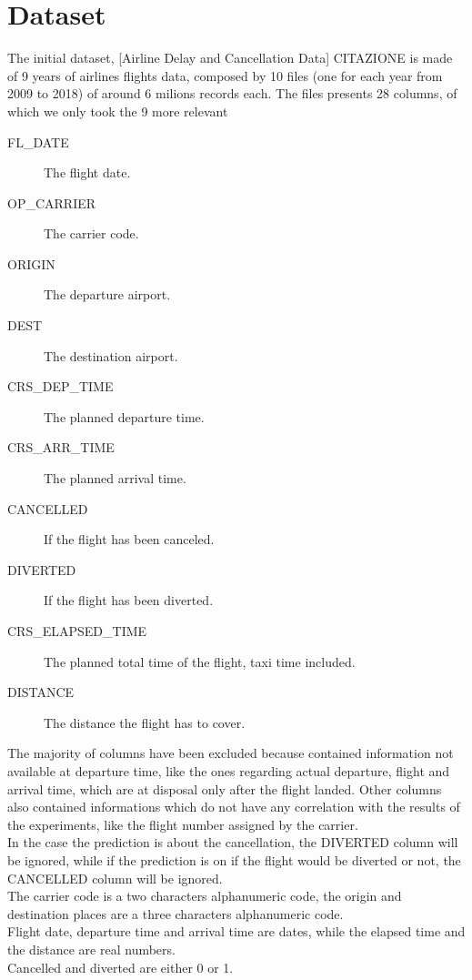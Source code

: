\documentclass[
	letterpaper, %
	10pt, %
]{class}
\begin{document}

\section{Dataset}

The initial dataset, [Airline Delay and Cancellation Data] CITAZIONE is made of 9 years of airlines flights data, composed by 10 files (one for each year from 2009 to 2018) of around 6 milions records each.
The files presents 28 columns, of which we only took the 9 more relevant\\

\begin{description}
	\item[FL\_DATE] The flight date.
	\item[OP\_CARRIER] The carrier code.
	\item[ORIGIN] The departure airport.
	\item[DEST] The destination airport.
	\item[CRS\_DEP\_TIME] The planned departure time.
	\item[CRS\_ARR\_TIME] The planned arrival time.
	\item[CANCELLED] If the flight has been canceled.
	\item[DIVERTED] If the flight has been diverted.
	\item[CRS\_ELAPSED\_TIME] The planned total time of the flight, taxi time included.
	\item[DISTANCE] The distance the flight has to cover.\\
\end{description}

The majority of columns have been excluded because contained information not available at departure time, like the ones regarding actual departure, flight and arrival time, which are at disposal only after the flight landed.
Other columns also contained informations which do not have any correlation with the results of the experiments, like the flight number assigned by the carrier.\\

In the case the prediction is about the cancellation, the DIVERTED column will be ignored, while if the prediction is on if the flight would be diverted or not, the CANCELLED column will be ignored.\\
The carrier code is a two characters alphanumeric code, the origin and destination places are a three characters alphanumeric code.\\
Flight date, departure time and arrival time are dates, while the elapsed time and the distance are real numbers.\\
Cancelled and diverted are either 0 or 1.\\
\end{document}
